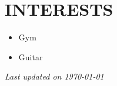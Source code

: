 \documentclass[11pt,a4paper]{moderncv}
\begin{document}
\begin{minipage}[t]{0.35\textwidth}
\section{INTERESTS}
\begin{itemize}
    \item Gym
    \item Guitar
\end{itemize}
\end{minipage}

\vspace*{\fill}
\begin{center}
\textit{Last updated on \today}
\end{center}
\vspace{-1.5cm}
\end{document}
